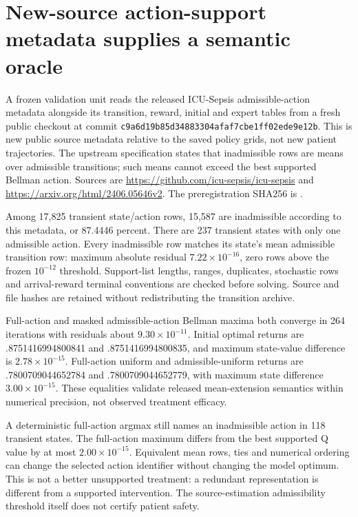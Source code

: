 \section{New-source action-support metadata supplies a semantic oracle}
A frozen validation unit reads the released ICU-Sepsis admissible-action metadata alongside its transition, reward, initial and expert tables from a fresh public checkout at commit \texttt{c9a6d19b85d34883304afaf7cbe1ff02ede9e12b}. This is new public source metadata relative to the saved policy grids, not new patient trajectories. The upstream specification states that inadmissible rows are means over admissible transitions; such means cannot exceed the best supported Bellman action. Sources are \url{https://github.com/icu-sepsis/icu-sepsis} and \url{https://arxiv.org/html/2406.05646v2}. The preregistration SHA256 is .

Among 17,825 transient state/action rows, 15,587 are inadmissible according to this metadata, or 87.4446 percent. There are 237 transient states with only one admissible action. Every inadmissible row matches its state's mean admissible transition row: maximum absolute residual $7.22\times10^{-16}$, zero rows above the frozen $10^{-12}$ threshold. Support-list lengths, ranges, duplicates, stochastic rows and arrival-reward terminal conventions are checked before solving. Source and file hashes are retained without redistributing the transition archive.

Full-action and masked admissible-action Bellman maxima both converge in 264 iterations with residuals about $9.30\times10^{-11}$. Initial optimal returns are .8751416994800841 and .8751416994800835, and maximum state-value difference is $2.78\times10^{-15}$. Full-action uniform and admissible-uniform returns are .7800709044652784 and .7800709044652779, with maximum state difference $3.00\times10^{-15}$. These equalities validate released mean-extension semantics within numerical precision, not observed treatment efficacy.

A deterministic full-action argmax still names an inadmissible action in 118 transient states. The full-action maximum differs from the best supported Q value by at most $2.00\times10^{-15}$. Equivalent mean rows, ties and numerical ordering can change the selected action identifier without changing the model optimum. This is not a better unsupported treatment: a redundant representation is different from a supported intervention. The source-estimation admissibility threshold itself does not certify patient safety.

